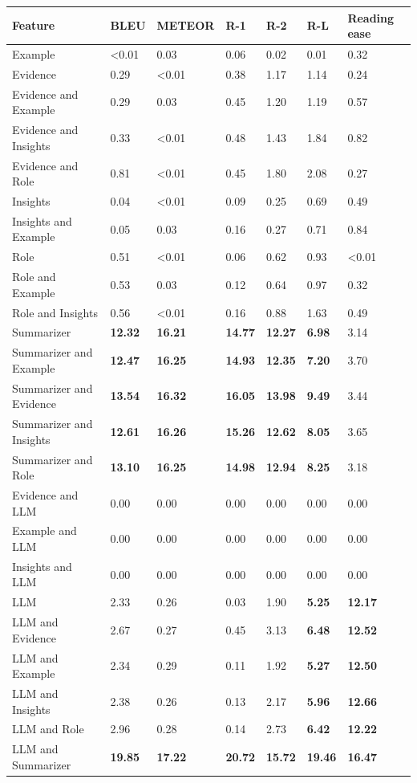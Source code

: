 \begin{tabular}{|l|l|l|l|l|l|l|}
\hline
\textbf{Feature} & BLEU & METEOR & R-1 & R-2 & R-L & Reading ease \\
 \hline
 Example & \textless{}0.01 & 0.03 & 0.06 & 0.02 & 0.01 & 0.32 \\
 \hline
 Evidence & 0.29 & \textless{}0.01 & 0.38 & 1.17 & 1.14 & 0.24 \\
 \hline
 Evidence and Example & 0.29 & 0.03 & 0.45 & 1.20 & 1.19 & 0.57 \\
 \hline
 Evidence and Insights & 0.33 & \textless{}0.01 & 0.48 & 1.43 & 1.84 & 0.82 \\
 \hline
 Evidence and Role & 0.81 & \textless{}0.01 & 0.45 & 1.80 & 2.08 & 0.27 \\
 \hline
 Insights & 0.04 & \textless{}0.01 & 0.09 & 0.25 & 0.69 & 0.49 \\
 \hline
 Insights and Example & 0.05 & 0.03 & 0.16 & 0.27 & 0.71 & 0.84 \\
 \hline
 Role & 0.51 & \textless{}0.01 & 0.06 & 0.62 & 0.93 & \textless{}0.01 \\
 \hline
 Role and Example & 0.53 & 0.03 & 0.12 & 0.64 & 0.97 & 0.32 \\
 \hline
 Role and Insights & 0.56 & \textless{}0.01 & 0.16 & 0.88 & 1.63 & 0.49 \\
 \hline
 Summarizer & \textbf{12.32} & \textbf{16.21} & \textbf{14.77} & \textbf{12.27} & \textbf{6.98} & 3.14 \\
 \hline
 Summarizer and Example & \textbf{12.47} & \textbf{16.25} & \textbf{14.93} & \textbf{12.35} & \textbf{7.20} & 3.70 \\
 \hline
 Summarizer and Evidence & \textbf{13.54} & \textbf{16.32} & \textbf{16.05} & \textbf{13.98} & \textbf{9.49} & 3.44 \\
 \hline
 Summarizer and Insights & \textbf{12.61} & \textbf{16.26} & \textbf{15.26} & \textbf{12.62} & \textbf{8.05} & 3.65 \\
 \hline
 Summarizer and Role & \textbf{13.10} & \textbf{16.25} & \textbf{14.98} & \textbf{12.94} & \textbf{8.25} & 3.18 \\
 \hline
 Evidence and LLM & 0.00 & 0.00 & 0.00 & 0.00 & 0.00 & 0.00 \\
 \hline
 Example and LLM & 0.00 & 0.00 & 0.00 & 0.00 & 0.00 & 0.00 \\
 \hline
 Insights and LLM & 0.00 & 0.00 & 0.00 & 0.00 & 0.00 & 0.00 \\
 \hline
 LLM & 2.33 & 0.26 & 0.03 & 1.90 & \textbf{5.25} & \textbf{12.17} \\
 \hline
 LLM and Evidence & 2.67 & 0.27 & 0.45 & 3.13 & \textbf{6.48} & \textbf{12.52} \\
 \hline
 LLM and Example & 2.34 & 0.29 & 0.11 & 1.92 & \textbf{5.27} & \textbf{12.50} \\
 \hline
 LLM and Insights & 2.38 & 0.26 & 0.13 & 2.17 & \textbf{5.96} & \textbf{12.66} \\
 \hline
 LLM and Role & 2.96 & 0.28 & 0.14 & 2.73 & \textbf{6.42} & \textbf{12.22} \\
 \hline
 LLM and Summarizer & \textbf{19.85} & \textbf{17.22} & \textbf{20.72} & \textbf{15.72} & \textbf{19.46} & \textbf{16.47} \\
\hline
\end{tabular}

